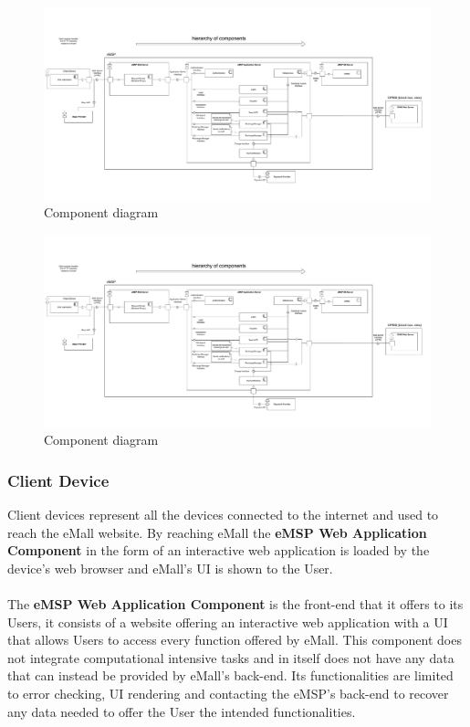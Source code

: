 \documentclass[11pt]{article}
\begin{document}
\begin{figure}[!ht]
    \centerline{
        \includegraphics[page={1}, width=1.26\linewidth, trim=0cm 2cm 0cm 4cm, angle=-90, clip]{ComponentDiagram.pdf}
    }
    \caption{Component diagram}
\end{figure}

\newpage

\begin{figure}[!ht]
    \centerline{
        \includegraphics[page={2}, width=1.26\linewidth, trim=3cm 1cm 4cm 3cm, angle=-90, clip]{ComponentDiagram.pdf}
    }
    \caption{Component diagram}
\end{figure}

\newpage

\subsubsection{Client Device}

Client devices represent all the devices connected to the internet and used to reach the eMall website. By reaching eMall the \textbf{eMSP Web Application Component} in the form of an interactive web application is loaded by the device's web browser and eMall's UI is shown to the User.\\
\\
The \textbf{eMSP Web Application Component} is the front-end that it offers to its Users, it consists of a website offering an interactive web application with a UI that allows Users to access every function offered by eMall. This component does not integrate computational intensive tasks and in itself does not have any data that can instead be provided by eMall's back-end. Its functionalities are limited to error checking, UI rendering and contacting the eMSP's back-end to recover any data needed to offer the User the intended functionalities.
\end{document}
